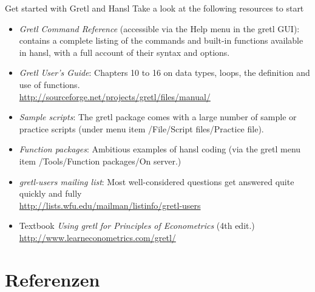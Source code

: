 \documentclass{beamer}[11pt]
\begin{document}
\begin{frame}{Get started with Gretl and Hansl}
	Take a look at the following resources to start
	\footnotesize
	\begin{itemize}
		\item \textit{Gretl Command Reference} (accessible via the Help menu in the gretl GUI): contains a complete listing of the commands and built-in functions available in hansl, with a full account of their syntax and options.
		\item \textit{Gretl User’s Guide}: Chapters 10 to 16 on data types, loops, the definition and use of functions.\\
		\url{http://sourceforge.net/projects/gretl/files/manual/}
		\item \textit{Sample scripts}: The gretl package comes with a large number of sample or practice scripts (under menu item /File/Script files/Practice file).
		\item \textit{Function packages}: Ambitious examples of hansl coding (via the gretl menu item /Tools/Function packages/On server.)
		\item \textit{gretl-users mailing list}: Most well-considered questions get answered quite quickly and
		fully\\
		\url{http://lists.wfu.edu/mailman/listinfo/gretl-users}
		\item Textbook \textit{Using gretl for Principles of Econometrics} (4th edit.) \url{http://www.learneconometrics.com/gretl/}
	\end{itemize}
\end{frame}





\section*{Referenzen}

\setcounter{secnumdepth}{0}

%	


\end{document}
